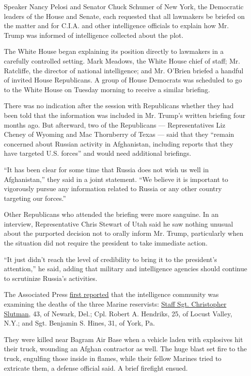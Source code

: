Speaker Nancy Pelosi and Senator Chuck Schumer of New York, the
Democratic leaders of the House and Senate, each requested that all
lawmakers be briefed on the matter and for C.I.A. and other intelligence
officials to explain how Mr. Trump was informed of intelligence
collected about the plot.

The White House began explaining its position directly to lawmakers in a
carefully controlled setting. Mark Meadows, the White House chief of
staff; Mr. Ratcliffe, the director of national intelligence; and Mr.
O'Brien briefed a handful of invited House Republicans. A group of House
Democrats was scheduled to go to the White House on Tuesday morning to
receive a similar briefing.

There was no indication after the session with Republicans whether they
had been told that the information was included in Mr. Trump's written
briefing four months ago. But afterward, two of the Republicans ---
Representatives Liz Cheney of Wyoming and Mac Thornberry of Texas ---
said that they ``remain concerned about Russian activity in Afghanistan,
including reports that they have targeted U.S. forces'' and would need
additional briefings.

``It has been clear for some time that Russia does not wish us well in
Afghanistan,'' they said in a joint statement. ``We believe it is
important to vigorously pursue any information related to Russia or any
other country targeting our forces.''

Other Republicans who attended the briefing were more sanguine. In an
interview, Representative Chris Stewart of Utah said he saw nothing
unusual about the purported decision not to orally inform Mr. Trump,
particularly when the situation did not require the president to take
immediate action.

``It just didn't reach the level of credibility to bring it to the
president's attention,'' he said, adding that military and intelligence
agencies should continue to scrutinize Russia's activities.

The Associated Press
\href{http://apnews.com/a59124b8eb95f6245286ddefe3dd0ffd}{first
reported} that the intelligence community was examining the deaths of
the three Marine reservists:
\href{https://www.nytimes.com/2019/04/09/nyregion/fdny-firefighter-killed-afghanistan.html}{Staff
Sgt. Christopher Slutman}, 43, of Newark, Del.; Cpl. Robert A. Hendriks,
25, of Locust Valley, N.Y.; and Sgt. Benjamin S. Hines, 31, of York, Pa.

They were killed near Bagram Air Base when a vehicle laden with
explosives hit their truck, wounding an Afghan contractor as well. The
huge blast set fire to the truck, engulfing those inside in flames,
while their fellow Marines tried to extricate them, a defense official
said. A brief firefight ensued.

